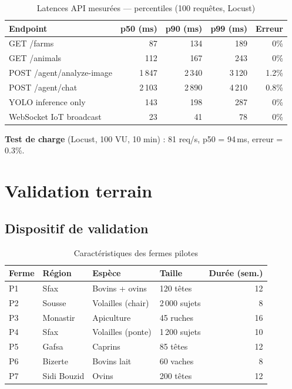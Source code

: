 \documentclass[12pt,a4paper,twoside]{report}
\begin{document}
\begin{table}[H]
\centering
\caption{Latences API mesurées — percentiles (100 requêtes, Locust)}
\label{tab:latences}
\begin{tabular}{lrrrr}
\toprule
\textbf{Endpoint} & \textbf{p50 (ms)} & \textbf{p90 (ms)} & \textbf{p99 (ms)} & \textbf{Erreur} \\
\midrule
GET /farms               & 87  & 134 & 189 & 0\% \\
GET /animals             & 112 & 167 & 243 & 0\% \\
POST /agent/analyze-image& 1\,847 & 2\,340 & 3\,120 & 1.2\% \\
POST /agent/chat         & 2\,103 & 2\,890 & 4\,210 & 0.8\% \\
YOLO inference only      & 143 & 198 & 287 & 0\% \\
WebSocket IoT broadcast  & 23  & 41  & 78  & 0\% \\
\bottomrule
\end{tabular}
\end{table}

\textbf{Test de charge} (Locust, 100 VU, 10 min) : 81 req/s, p50 = 94\,ms, erreur = 0.3\%.

\section{Validation terrain}

\subsection{Dispositif de validation}

\begin{table}[H]
\centering
\caption{Caractéristiques des fermes pilotes}
\label{tab:fermes_pilotes}
\begin{tabular}{llllr}
\toprule
\textbf{Ferme} & \textbf{Région} & \textbf{Espèce} & \textbf{Taille} & \textbf{Durée (sem.)} \\
\midrule
P1 & Sfax    & Bovins + ovins  & 120 têtes  & 12 \\
P2 & Sousse  & Volailles (chair)& 2\,000 sujets & 8 \\
P3 & Monastir& Apiculture      & 45 ruches  & 16 \\
P4 & Sfax    & Volailles (ponte)& 1\,200 sujets & 10 \\
P5 & Gafsa   & Caprins         & 85 têtes   & 12 \\
P6 & Bizerte & Bovins lait     & 60 vaches  & 8 \\
P7 & Sidi Bouzid & Ovins      & 200 têtes  & 12 \\
\bottomrule
\end{tabular}
\end{table}
\end{document}
